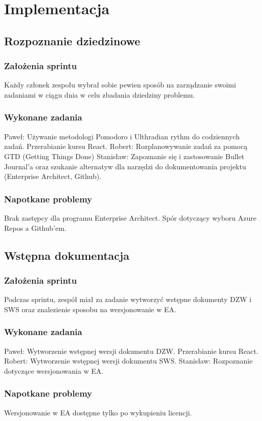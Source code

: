 \documentclass[a4paper,11pt]{report}
\begin{document}
\chapter {Implementacja}

\section {Rozpoznanie dziedzinowe}
\subsection {Założenia sprintu}
Każdy członek zespołu wybrał sobie pewien sposób na zarządzanie swoimi zadaniami w ciągu dnia w celu zbadania dziedziny problemu.
\subsection {Wykonane zadania}
Paweł: Używanie metodologi Pomodoro i Ulthradian rythm do codziennych zadań. Przerabianie kursu React.
Robert: Rozplanowywanie zadań za pomocą GTD (Getting Things Done)
Stanisław: Zapoznanie się i zastosowanie Bullet Journal'a oraz szukanie alternatyw dla narzędzi do dokumentowania projektu (Enterprise Architect, Github).
\subsection {Napotkane problemy}
Brak zastępcy dla programu Enterprise Architect. Spór dotyczący wyboru Azure Repos a Github'em.

\section {Wstępna dokumentacja}
\subsection {Założenia sprintu}
Podczas sprintu, zespół miał za zadanie wytworzyć wstępne dokumenty DZW i SWS oraz znalezienie sposobu na wersjonowanie w EA.
\subsection {Wykonane zadania}
Paweł: Wytworzenie wstępnej wersji dokumentu DZW. Przerabianie kursu React.
Robert: Wytworzenie wstępnej wersji dokumentu SWS.
Stanisław: Rozpoznanie dotyczące wersjonowania w EA.
\subsection {Napotkane problemy}
Wersjonowanie w EA dostępne tylko po wykupieniu licencji.
\end{document}
